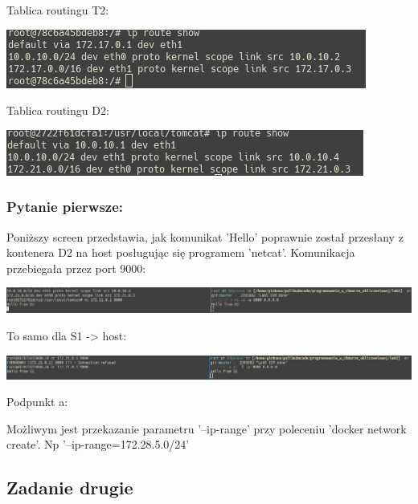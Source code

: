 \documentclass[12pt]{article}
\begin{document}
    \vspace{2cm}

    Tablica routingu T2:

    \includegraphics[width=\textwidth]{T2route.png}

    \vspace{0.5cm}

    Tablica routingu D2:

    \includegraphics[width=\textwidth]{D2route.png}

    \subsubsection{Pytanie pierwsze:}

    Poniższy screen przedstawia, jak komunikat 'Hello' poprawnie został przesłany z kontenera D2 na host posługując się programem 'netcat'. Komunikacja przebiegała przez port 9000:

    \includegraphics[width=\textwidth]{D2hello.png}

    To samo dla S1 -> host:

    \includegraphics[width=\textwidth]{S1hello.png}

    \vspace{1cm}

    {\large Podpunkt a:}
    \vspace{0.5cm}

    Możliwym jest przekazanie parametru '--ip-range' przy poleceniu 'docker network create'. Np '--ip-range=172.28.5.0/24'


    \subsection{Zadanie drugie}
\end{document}
